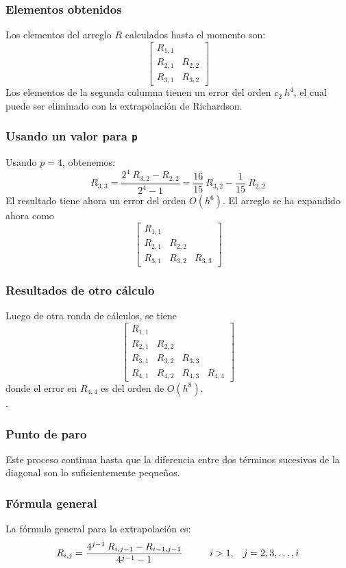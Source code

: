 \begin{frame}
\frametitle{Elementos obtenidos}
Los elementos del arreglo $R$ calculados hasta el momento son:
\[ \begin{bmatrix}
R_{1, 1} & \\
R_{2, 1} & R_{2, 2} \\
R_{3, 1} & R_{3, 2}
\end{bmatrix} \]
Los elementos de la segunda columna tienen un error del orden $c_{2} \: h^{4}$, el cual puede ser eliminado con la extrapolación de Richardson.
\end{frame}
\begin{frame}
\frametitle{Usando un valor para \texttt{p}}
Usando $p = 4$, obtenemos:
\[ R_{3, 3} = \dfrac{2^{4} \: R_{3, 2}-R_{2, 2}}{2^{4} - 1} = \dfrac{16}{15} \: R_{3, 2} - \dfrac{1}{15} \: R_{2, 2} \]
El resultado tiene ahora un error del orden $O(h^{6})$. El arreglo se ha expandido ahora como
\[ \begin{bmatrix}
R_{1, 1} &  & \\
R_{2, 1} & R_{2, 2} & \\
R_{3, 1} & R_{3, 2} & R_{3, 3}
\end{bmatrix} \]
\end{frame}
\begin{frame}
\frametitle{Resultados de otro cálculo}
Luego de otra ronda de cálculos, se tiene
\[ \begin{bmatrix}
R_{1, 1} &  & & \\
R_{2, 1} & R_{2, 2} & & \\
R_{3, 1} & R_{3, 2} & R_{3, 3} & \\
R_{4, 1} & R_{4, 2} & R_{4, 3} & R_{4, 4}
\end{bmatrix} \]
donde el error en $R_{4, 4}$ es del orden de $O(h^{8})$.
\\
\bigskip
\pause
{}.
\end{frame}
\begin{frame}
\frametitle{Punto de paro}
Este proceso continua hasta que la diferencia entre dos términos sucesivos de la diagonal son lo suficientemente pequeños.
\end{frame}
\begin{frame}
\frametitle{Fórmula general}
La fórmula general para la extrapolación es:
\[ R_{i, j} = \dfrac{4^{j - 1} \: R_{i, j - 1} - R_{i - 1, j - 1} }{4^{j - 1} - 1} \hspace{1cm} i > 1, \hspace{0.3cm} j = 2,3,\ldots,i \]
\end{frame}
